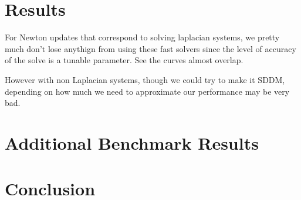 \documentclass[11pt]{article}
\theoremstyle{definition}
\theoremstyle{definition}
\begin{document}
\section{Results}
For Newton updates that correspond to solving laplacian systems, we pretty much don't lose anythign from using these fast solvers since the level of accuracy of the solve is a tunable parameter. See the curves almost overlap. 

However with non Laplacian systems, though we could try to make it SDDM, depending on how much we need to approximate our performance may be very bad.
\section{Additional Benchmark Results}
\section{Conclusion}




\end{document}
